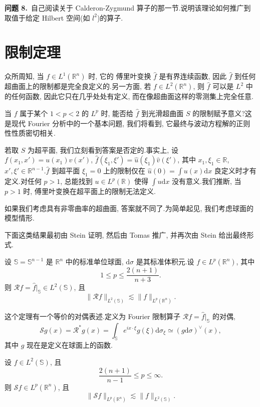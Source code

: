 \noindent\textbf{问题 8.}~自己阅读关于 Calderon-Zygmund 算子的那一节.说明该理论如何推广到取值于给定 Hilbert 空间(如 $l^2$)的算子.
\section{限制定理}

众所周知, 当 $f \in L^1(\mathbb{R}^n)$ 时, 它的 傅里叶变换 $\hat{f}$ 是有界连续函数, 因此 $\hat{f}$ 到任何超曲面上的限制都是完全良定义的.另一方面, 若 $f \in L^2(\mathbb{R}^n)$, 则 $\hat{f}$ 可以是 $L^2$ 中的任何函数, 因此它只在几乎处处有定义, 而在像超曲面这样的零测集上完全任意.

当 $f$ 属于某个 $1 < p < 2$ 的 $L^p$ 时, 能否给 $\hat{f}$ 到光滑超曲面 $S$ 的限制赋予意义?这是现代 Fourier 分析中的一个基本问题, 我们将看到, 它最终与波动方程解的正则性性质密切相关.

若取 $S$ 为超平面, 我们立刻看到答案是否定的.事实上, 设 $f(x_1, x') = u(x_1) v(x')$, $\hat{f}(\xi_1, \xi') = \hat{u}(\xi_1) \hat{v}(\xi')$, 其中 $x_1, \xi_1 \in \mathbb{R}$, $x', \xi' \in \mathbb{R}^{n-1}$.$\hat{f}$ 到超平面 $\xi_1 = 0$ 上的限制仅在 $\hat{u}(0) = \int u(x) \mathrm{d}x$ 良定义时才有定义.对任何 $p > 1$, 总能找到 $u \in L^p(\mathbb{R})$ 使得 $\int u \mathrm{d}x$ 没有意义.我们推断, 当 $p > 1$ 时, 傅里叶变换在超平面上的限制无法定义.

如果我们考虑具有非零曲率的超曲面, 答案就不同了.为简单起见, 我们考虑球面的模型情形.


下面这类结果最初由 Stein 证明, 然后由 Tomas 推广, 并再次由 Stein 给出最终形式.

\begin{theorem}\label{thm:c6-8.2}
设 $\mathbb{S} = \mathbb{S}^{n-1}$ 是 $\mathbb{R}^n$ 中的标准单位球面, $\mathrm{d}\sigma$ 是其标准体积元.设 $f \in L^p(\mathbb{R}^n)$, 其中
\[
1 \leq p \leq \frac{2(n+1)}{n+3}.
\]
则 $\mathcal{R} f = \hat{f}\big|_{\mathbb{S}} \in L^2(\mathbb{S})$, 且
\[
\|\mathcal{R} f\|_{L^2(\mathbb{S})} \lesssim \|f\|_{L^p(\mathbb{R}^n)}.
\]
\end{theorem}

这个定理有一个等价的对偶表述.定义为 Fourier 限制算子 $\mathcal{R} f = \hat{f}\big|_{\mathbb{S}}$ 的对偶,
\[
\mathcal{S} g(x) = \mathcal{R}^* g(x) = \int_{\mathbb{S}} e^{ix \cdot \xi} g(\xi) \mathrm{d}\sigma_\xi \simeq (g \mathrm{d}\sigma)^\vee (x),
\]
其中 $g$ 现在是定义在球面上的函数.

\begin{theorem}\label{thm:c6-8.3}
设 $f \in L^2(\mathbb{S})$, 且
\[
\frac{2(n+1)}{n-1} \leq p \leq \infty.
\]
则 $\mathcal{S} f \in L^p(\mathbb{R}^n)$, 且
\begin{equation}
\|\mathcal{S} f\|_{L^p(\mathbb{R}^n)} \lesssim \|f\|_{L^2(\mathbb{S})}.\label{eq:c6-283}
\end{equation}
\end{theorem}

